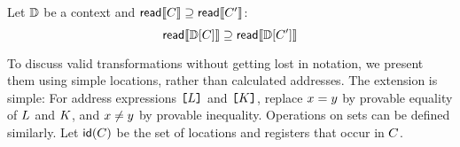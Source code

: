 \begin{lemma}%
  Let $\mathbb{D}$ be a context
and ${\mathsf{read}}\llbracket C\rrbracket \supseteq {\mathsf{read}}\llbracket C'\rrbracket$:
\begin{displaymath}
  \readc\sem{\bCtxt\hole{\aCmd}} \supseteq \readc\sem{\bCtxt\hole{\aCmd'}}
\end{displaymath}
\end{lemma}

To discuss valid transformations without getting lost in notation, we present
them using simple locations, rather than calculated addresses.  The extension
is simple: For address expressions $\texttt{[}L\texttt{]}$ and $\texttt{[}K\texttt{]}$, replace
$x=y$ by provable equality of $L$ and $K$, and
$x\neq y$ by provable inequality.  Operations on
sets can be defined similarly.
%
Let $\mathsf{id}(C)$ be the set of locations and registers that occur in $C$.


